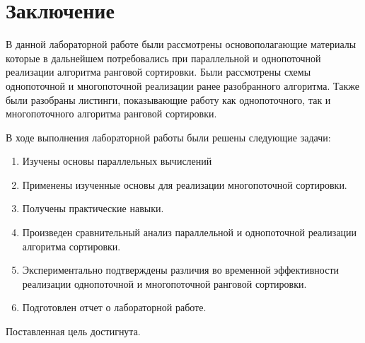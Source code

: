 \chapter*{Заключение}

В данной лабораторной работе были рассмотрены основополагающие материалы которые в дальнейшем потребовались при параллельной и однопоточной реализации алгоритма ранговой сортировки. Были рассмотрены схемы однопоточной и многопоточной реализации ранее разобранного алгоритма. Также были разобраны листинги, показывающие работу как однопоточного, так и многопоточного алгоритма ранговой сортировки.


В ходе выполнения лабораторной работы были решены следующие задачи:



\begin{enumerate}
	\item Изучены основы параллельных вычислений
	\item Применены изученные основы для реализации многопоточной сортировки.
	
	\item Получены практические навыки.
	\item Произведен сравнительный анализ параллельной и однопоточной реализации алгоритма сортировки.
	\item Экспериментально подтверждены различия во временной эффективности реализации однопоточной и многопоточной ранговой сортировки.
	
	\item Подготовлен отчет о лабораторной работе.
\end{enumerate}

Поставленная цель достигнута.

